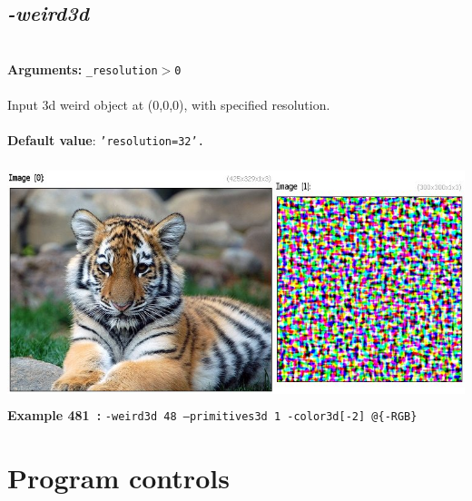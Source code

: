 \documentclass[a4paper,11pt,twoside]{book}
\begin{document}
\subsection{\emph{-weird3d} }\vspace*{-0.5em}
~\\\textbf{Arguments: } 
{\small \texttt{\_resolution$>$0}}\\~\\
Input 3d weird object at (0,0,0), with specified resolution.
~\\~\\\textbf{Default value}: {\small \texttt{'resolution=32'.}}
\begin{center}\includegraphics[keepaspectratio=true,height=7cm,width=\textwidth]{img/gmic_def481.jpg}\\
{\footnotesize \textbf{Example 481~:} \texttt{-weird3d 48 --primitives3d 1 -color3d[-2] @\{-RGB\}}}
\end{center}
\section{Program controls}
\end{document}

